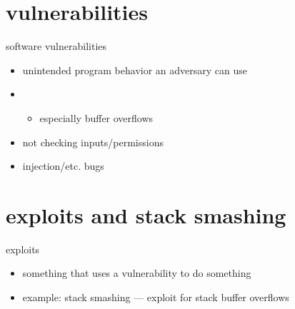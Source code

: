 \section{vulnerabilities}

\begin{frame}{software vulnerabilities}
    \begin{itemize}
    \item unintended program behavior an adversary can use
    \vspace{.5cm}
    \item {}
        \begin{itemize}
        \item especially buffer overflows
        \end{itemize}
    \item not checking inputs/permissions
    \item injection/etc. bugs
    \end{itemize}
\end{frame}

\section{exploits and stack smashing}

\begin{frame}{exploits}
    \begin{itemize}
    \item something that uses a vulnerability to do something
    \item example: stack smashing --- exploit for stack buffer overflows
    \end{itemize}
\end{frame}

